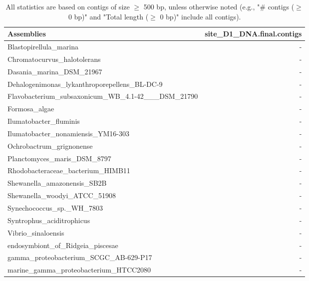 \documentclass[12pt,a4paper]{article}
\begin{document}
\begin{table}[ht]
\begin{center}
\caption{All statistics are based on contigs of size $\geq$ 500 bp, unless otherwise noted (e.g., "\# contigs ($\geq$ 0 bp)" and "Total length ($\geq$ 0 bp)" include all contigs).}
\begin{tabular}{|l*{1}{|r}|}
\hline
Assemblies & site\_D1\_DNA.final.contigs \\ \hline
Blastopirellula\_marina & - \\ \hline
Chromatocurvus\_halotolerans & - \\ \hline
Dasania\_marina\_DSM\_21967 & - \\ \hline
Dehalogenimonas\_lykanthroporepellens\_BL-DC-9 & - \\ \hline
Flavobacterium\_subsaxonicum\_WB\_4.1-42\_\_\_DSM\_21790 & - \\ \hline
Formosa\_algae & - \\ \hline
Ilumatobacter\_fluminis & - \\ \hline
Ilumatobacter\_nonamiensis\_YM16-303 & - \\ \hline
Ochrobactrum\_grignonense & - \\ \hline
Planctomyces\_maris\_DSM\_8797 & - \\ \hline
Rhodobacteraceae\_bacterium\_HIMB11 & - \\ \hline
Shewanella\_amazonensis\_SB2B & - \\ \hline
Shewanella\_woodyi\_ATCC\_51908 & - \\ \hline
Synechococcus\_sp.\_WH\_7803 & - \\ \hline
Syntrophus\_aciditrophicus & - \\ \hline
Vibrio\_sinaloensis & - \\ \hline
endosymbiont\_of\_Ridgeia\_piscesae & - \\ \hline
gamma\_proteobacterium\_SCGC\_AB-629-P17 & - \\ \hline
marine\_gamma\_proteobacterium\_HTCC2080 & - \\ \hline
\end{tabular}
\end{center}
\end{table}
\end{document}
